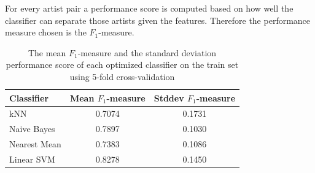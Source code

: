 For every artist pair a performance score is computed based on how well the classifier can separate those artists given the features.
Therefore the performance measure chosen is the $F_1$-measure.

%
%


\begin{table}[htb]
    \centering
    \begin{tabular}
        { | l | c | c |} 
        \hline
        Classifier & Mean $F_1$-measure & Stddev $F_1$-measure  \\
        \hline
        kNN & 0.7074 & 0.1731 \\ 
        Naive Bayes & 0.7897 & 0.1030 \\ 
        Nearest Mean & 0.7383 & 0.1086 \\ 
        Linear SVM & 0.8278 & 0.1450 \\ 
        \hline 
    \end{tabular}
    \caption{The mean $F_1$-measure and the standard deviation performance score of each optimized classifier on the train set using 5-fold cross-validation}
    \label{ex2optimizeresults}
\end{table}


